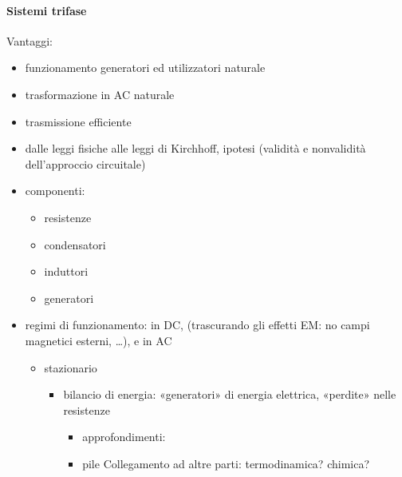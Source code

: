 \documentclass[letterpaper,10pt,italian]{jupyterBook}
\begin{document}
\paragraph{Sistemi trifase}
\label{\detokenize{ch/electromagnetism/circuits-electric:sistemi-trifase}}\label{\detokenize{ch/electromagnetism/circuits-electric:physics-hs-electromagnetism-circuits-electric-regimes-ac-tri}}
\sphinxAtStartPar
Vantaggi:
\begin{itemize}
\item {} 
\sphinxAtStartPar
funzionamento generatori ed utilizzatori naturale

\item {} 
\sphinxAtStartPar
trasformazione in AC naturale

\item {} 
\sphinxAtStartPar
trasmissione efficiente

\item {} 
\sphinxAtStartPar
dalle leggi fisiche alle leggi di Kirchhoff, ipotesi (validità e non\sphinxhyphen{}validità dell’approccio circuitale)

\item {} 
\sphinxAtStartPar
componenti:
\begin{itemize}
\item {} 
\sphinxAtStartPar
resistenze

\item {} 
\sphinxAtStartPar
condensatori

\item {} 
\sphinxAtStartPar
induttori

\item {} 
\sphinxAtStartPar
generatori

\end{itemize}

\item {} 
\sphinxAtStartPar
regimi di funzionamento: in DC, (trascurando gli effetti EM: no campi magnetici esterni, …), e in AC
\begin{itemize}
\item {} 
\sphinxAtStartPar
stazionario
\begin{itemize}
\item {} 
\sphinxAtStartPar
bilancio di energia: «generatori» di energia elettrica, «perdite» nelle resistenze
\begin{itemize}
\item {} 
\sphinxAtStartPar
approfondimenti:

\item {} 
\sphinxAtStartPar
pile  Collegamento ad altre parti: termodinamica? chimica?


\end{itemize}
\end{itemize}
\end{itemize}
\end{itemize}
\end{document}
